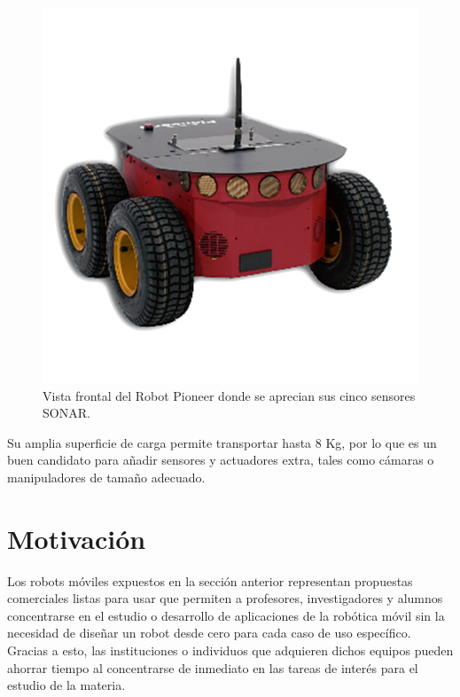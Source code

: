 \begin{figure}[ht]
	\centering
	\includegraphics[scale=1.]{./Figures/pioneer.png}
	\caption{Vista frontal del Robot Pioneer donde se aprecian sus cinco sensores SONAR.\protect\footnotemark}
	\label{fig:robotPioneer}
\end{figure}


Su amplia superficie de carga permite transportar hasta 8 Kg, por lo que es un buen candidato para añadir sensores y actuadores extra, tales como cámaras o manipuladores de tamaño adecuado.

\section{Motivación}

Los robots móviles expuestos en la sección anterior representan propuestas comerciales listas para usar que permiten a profesores, investigadores y alumnos concentrarse en el estudio o desarrollo de aplicaciones de la robótica móvil sin la necesidad de diseñar un robot desde cero para cada caso de uso específico. Gracias a esto, las instituciones o individuos que adquieren dichos equipos pueden ahorrar tiempo al concentrarse de inmediato en las tareas de interés para el estudio de la materia.

